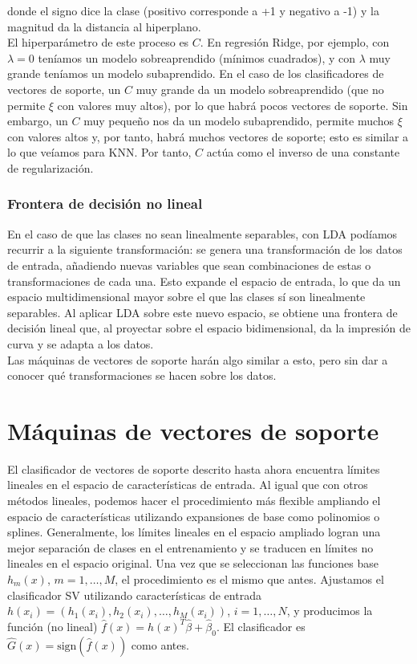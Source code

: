 \noindent donde el signo dice la clase (positivo corresponde a +1 y negativo a -1) y la magnitud da la distancia al hiperplano. \\

El hiperparámetro de este proceso es $C$. En regresión Ridge, por ejemplo, con $\lambda = 0$ teníamos un modelo sobreaprendido (mínimos cuadrados), y con $\lambda$ muy grande teníamos un modelo subaprendido. En el caso de los clasificadores de vectores de soporte, un $C$ muy grande da un modelo sobreaprendido (que no permite $\xi$ con valores muy altos), por lo que habrá pocos vectores de soporte. Sin embargo, un $C$ muy pequeño nos da un modelo subaprendido, permite muchos $\xi$ con valores altos y, por tanto, habrá muchos vectores de soporte; esto es similar a lo que veíamos para KNN. Por tanto, $C$ actúa como el inverso de una constante de regularización. \\


\subsubsection{Frontera de decisión no lineal}

En el caso de que las clases no sean linealmente separables, con LDA podíamos recurrir a la siguiente transformación: se genera una transformación de los datos de entrada, añadiendo nuevas variables que sean combinaciones de estas o transformaciones de cada una. Esto expande el espacio de entrada, lo que da un espacio multidimensional mayor sobre el que las clases sí son linealmente separables. Al aplicar LDA sobre este nuevo espacio, se obtiene una frontera de decisión lineal que, al proyectar sobre el espacio bidimensional, da la impresión de curva y se adapta a los datos. \\

Las máquinas de vectores de soporte harán algo similar a esto, pero sin dar a conocer qué transformaciones se hacen sobre los datos.

\section{Máquinas de vectores de soporte}

El clasificador de vectores de soporte descrito hasta ahora encuentra límites lineales en el espacio de características de entrada. Al igual que con otros métodos lineales, podemos hacer el procedimiento más flexible ampliando el espacio de características utilizando expansiones de base como polinomios o splines. Generalmente, los límites lineales en el espacio ampliado logran una mejor separación de clases en el entrenamiento y se traducen en límites no lineales en el espacio original. Una vez que se seleccionan las funciones base $h_m(x)$, $m = 1, \ldots, M$, el procedimiento es el mismo que antes. Ajustamos el clasificador SV utilizando características de entrada $h(x_i) = (h_1(x_i), h_2(x_i), \ldots, h_M(x_i))$, $i = 1, \ldots, N$, y producimos la función (no lineal) $\hat{f}(x) = h(x)^T \hat{\beta} + \hat{\beta}_0$. El clasificador es $\hat{G}(x) = \text{sign}(\hat{f}(x))$ como antes. \\

